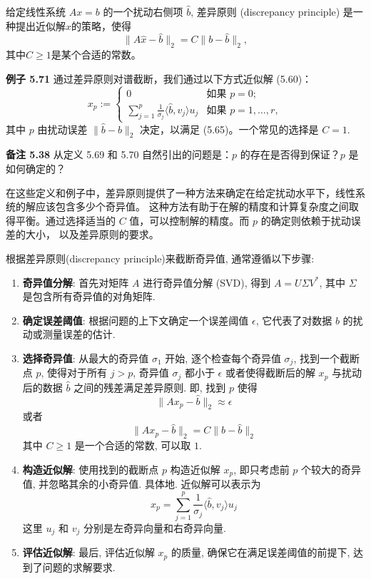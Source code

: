 \documentclass[a4paper]{ctexart}
\newcommand{\hl}[1]
{\noindent {\bf {#1}}}
\begin{document}
{\hl{定义5.64} 给定线性系统 $Ax = b$ 的一个扰动右侧项 $\hat{b}$, 
差异原则 (discrepancy principle) 是一种提出近似解$\hat{x}$的策略，使得
\[ 
  \|A\hat{x} - \hat{b}\|_2 = C\|b - \hat{b}\|_2,  \tag{5.65}
\]
其中$C \geq 1$是某个合适的常数。


\noindent \textbf{例子 5.71 } 通过差异原则对谱截断，我们通过以下方式近似解 (5.60)：
\[
  x_p := \left\{
  \begin{array}{ll}
    0 & \text{如果 } p = 0; \\
    \sum_{j=1}^p \frac{1}{\sigma_j} \langle \hat{b}, v_j \rangle u_j & \text{如果 } p = 1, \ldots, r,
  \end{array}
  \right. \tag{5.66}
\]
其中 \(p\) 由扰动误差 \(\|\hat{b} - b\|_2\) 决定，以满足 (5.65)。一个常见的选择是 \(C = 1\).

\noindent \textbf{备注 5.38 } 从定义 5.69 和 5.70 自然引出的问题是：\(p\) 的存在是否得到保证？\(p\) 是如何确定的？

在这些定义和例子中，差异原则提供了一种方法来确定在给定扰动水平下，线性系统的解应该包含多少个奇异值。
这种方法有助于在解的精度和计算复杂度之间取得平衡。通过选择适当的 \(C\) 值，可以控制解的精度。而 \(p\) 的确定则依赖于扰动误差的大小，
以及差异原则的要求。



根据差异原则(discrepancy principle)来截断奇异值, 通常遵循以下步骤:

\begin{enumerate}
  \item {\bf 奇异值分解}: 首先对矩阵 $A$ 进行奇异值分解 (SVD), 
  得到 $A = U\Sigma V^*$, 其中 $\Sigma$ 是包含所有奇异值的对角矩阵. 
  \item {\bf 确定误差阈值}: 根据问题的上下文确定一个误差阈值 $\epsilon$, 
  它代表了对数据 $b$ 的扰动或测量误差的估计. 
  \item {\bf 选择奇异值}: 从最大的奇异值 $\sigma_1$ 开始, 
  逐个检查每个奇异值 $\sigma_j$, 找到一个截断点 $p$, 使得对于所有 $j > p$, 
  奇异值 $\sigma_j$ 都小于 $\epsilon$ 或者使得截断后的解 $x_p$ 与扰动后的数据
  $\hat{b}$ 之间的残差满足差异原则. 即, 找到 $p$ 使得
  \[ 
  \|A x_p - \hat{b}\|_2 \approx \epsilon 
  \]
  或者
  \[ 
  \|A x_p - \hat{b}\|_2 = C \|b - \hat{b}\|_2 
  \]
  其中 $C \geq 1$ 是一个合适的常数, 可以取 $1$.
  \item {\bf 构造近似解}: 使用找到的截断点 $p$ 构造近似解 $x_p$, 
  即只考虑前 $p$ 个较大的奇异值, 并忽略其余的小奇异值. 具体地. 近似解可以表示为
  \[ 
  x_p = \sum_{j=1}^{p} \frac{1}{\sigma_j} \langle \hat{b}, v_j \rangle u_j 
  \]
  这里 $u_j$ 和 $v_j$ 分别是左奇异向量和右奇异向量.
  \item {\bf 评估近似解}: 最后, 评估近似解 $x_p$ 的质量, 确保它在满足误差阈值的前提下, 
  达到了问题的求解要求.
\end{enumerate}

}
\end{document}
